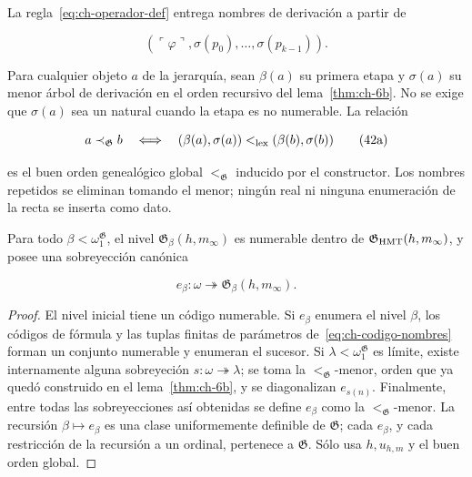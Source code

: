La regla~\eqref{eq:ch-operador-def} entrega nombres de derivación a partir de

\[
 (\ulcorner\varphi\urcorner,
  \sigma(p_0),\ldots,\sigma(p_{k-1})).
\tag{42}\label{eq:ch-codigo-nombres}
\]

Para cualquier objeto \(a\) de la jerarquía, sean \(\beta(a)\) su primera
etapa y \(\sigma(a)\) su menor árbol de derivación en el orden recursivo del
lema~\ref{thm:ch-6b}. No se exige que \(\sigma(a)\) sea un natural cuando la etapa es no
numerable. La relación

\[
 a\prec_{\mathfrak G}b
 \quad\Longleftrightarrow\quad
 (\beta(a),\sigma(a))<_{\rm lex}
 (\beta(b),\sigma(b))
\tag{42a}\label{eq:ch-orden-genealogico}
\]

es el buen orden genealógico global \(<_{\mathfrak G}\) inducido por el
constructor. Los nombres repetidos se eliminan tomando el menor; ningún real
ni ninguna enumeración de la recta se inserta como dato.

\begin{lemma}
\label{thm:ch-7}
Para todo
\(\beta<\omega_1^{\mathfrak G}\), el nivel
\(\mathfrak G_\beta(h,m_\infty)\) es numerable dentro de
\(\mathfrak G_{\rm HMT}(h,m_\infty)\), y posee una sobreyección canónica

\[
 e_\beta:\omega\twoheadrightarrow
 \mathfrak G_\beta(h,m_\infty).
\tag{43}\label{eq:ch-enumeracion-niveles}
\]

\end{lemma}
\begin{proof}
El nivel inicial tiene un código numerable. Si \(e_\beta\)
enumera el nivel \(\beta\), los códigos de fórmula y las tuplas finitas de
parámetros de~\eqref{eq:ch-codigo-nombres} forman un conjunto numerable y enumeran el sucesor. Si
\(\lambda<\omega_1^{\mathfrak G}\) es límite, existe internamente alguna
sobreyeción \(s:\omega\twoheadrightarrow\lambda\); se toma la
\(<_{\mathfrak G}\)-menor, orden que ya quedó construido en el lema~\ref{thm:ch-6b}, y se
diagonalizan \(e_{s(n)}\). Finalmente, entre todas las sobreyecciones así
obtenidas se define \(e_\beta\) como la \(<_{\mathfrak G}\)-menor. La
recursión \(\beta\mapsto e_\beta\) es una clase uniformemente definible de
\(\mathfrak G\); cada \(e_\beta\), y cada restricción de la recursión a un
ordinal, pertenece a \(\mathfrak G\). Sólo usa \(h,u_{h,m}\) y el buen orden
global.
\end{proof}

